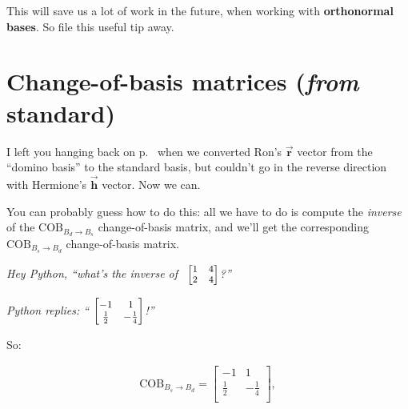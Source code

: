 This will save us a lot of work in the future, when working with
\textbf{orthonormal bases}. So file this useful tip away.


\section[Change-of-basis matrices]{\large Change-of-basis matrices (\textit{from} standard)}

\label{changeOfBasisOtherWayFinally}


I left you hanging back on p.~\pageref{changeOfBasisOtherWayCliffhanger} when
we converted Ron's $\overrightarrow{\textbf{r}}$ vector from the ``domino
basis'' to the standard basis, but couldn't go in the reverse direction with
Hermione's $\overrightarrow{\textbf{h}}$ vector. Now we can.

\smallskip
You can probably guess how to do this: all we have to do is compute the
\textit{inverse} of the $\textrm{COB}_{B_d \rightarrow B_s}$ change-of-basis
matrix, and we'll get the corresponding $\textrm{COB}_{B_s \rightarrow B_d}$
change-of-basis matrix.

\begin{center}
\textit{Hey Python, ``what's the inverse of \
${\footnotesize \begin{bmatrix}
1 & 4 \\
2 & 4 \\
\end{bmatrix}}$?''
}

\textit{Python replies: ``
${\small
\begingroup
\begin{bmatrix}
-1 & 1 \\
\frac{1}{2} & -\frac{1}{4} \\
\end{bmatrix}
\endgroup}$!''
}
\end{center}

So:

\vspace{-.15in}
\begin{align*}
\textrm{COB}_{B_s \rightarrow B_d} =
\begin{bmatrix}
-1 & 1 \\
\frac{1}{2} & -\frac{1}{4} \\
\end{bmatrix},
\end{align*}
\vspace{-.15in}

